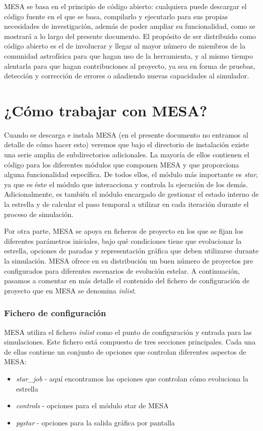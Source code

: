 MESA se basa en el principio de código abierto: cualquiera puede descargar el código fuente en el que se basa, compilarlo y ejecutarlo para sus propias necesidades de investigación, además de poder ampliar su funcionalidad, como se mostrará a lo largo del presente documento. El propósito de ser distribuido como código abierto es el de involucrar y llegar al mayor número de miembros de la comunidad astrofísica para que hagan uso de la herramienta, y al mismo tiempo alentarla para que hagan contribuciones al proyecto, ya sea en forma de pruebas, detección y corrección de errores o añadiendo nuevas capacidades al simulador.\par

\section{¿Cómo trabajar con MESA?}
Cuando se descarga e instala MESA (en el presente documento no entramos al detalle de cómo hacer esto) veremos que bajo el directorio de instalación existe una serie amplia de subdirectorios adicionales. La mayoría de ellos contienen el código para los diferentes módulos que componen MESA y que proporciona alguna funcionalidad específica. De todos ellos, el módulo más importante es \textit{star}, ya que es éste el módulo que interacciona y controla la ejecución de los demás. Adicionalmente, es también el módulo encargado de gestionar el estado interno de la estrella y de calcular el paso temporal a utilizar en cada iteración durante el proceso de simulación.\par

Por otra parte, MESA se apoya en ficheros de proyecto en los que se fijan los diferentes parámetros iniciales, bajo qué condiciones tiene que evolucionar la estrella, opciones de paradas y representación gráfica que deben utilizarse durante la simulación. MESA ofrece en su distribución un buen número de proyectos pre configurados para diferentes escenarios de evolución estelar. A continuación, pasamos a comentar en más detalle el contenido del fichero de configuración de proyecto que en MESA se denomina \textit{inlist}.\par

\subsubsection{Fichero de configuración}
MESA utiliza el fichero \textit{inlist} como el punto de configuración y entrada para las simulaciones. Este fichero está compuesto de tres secciones principales. Cada una de ellas contiene un conjunto de opciones que controlan diferentes aspectos de MESA:
\begin{itemize}
    \item \textit{star\_job} - aquí encontramos las opciones que controlan cómo evoluciona la estrella
    \item \textit{controls} - opciones para el módulo star de MESA
    \item \textit{pgstar} - opciones para la salida gráfica por pantalla
\end{itemize}

